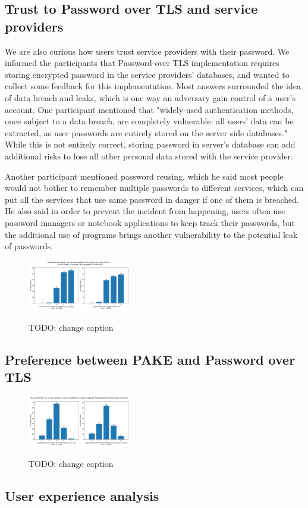 \subsection{Trust to Password over TLS and service providers}
We are also curious how users trust service providers with their password.
We informed the participants that Password over TLS implementation requires storing encrypted password in the service providers' databases, and wanted to collect some feedback for this implementation.
Most answers surrounded the idea of data breach and leaks, which is one way an adversary gain control of a user's account.
One participant mentioned that "widely-used authentication methods, once subject to a data breach, are completely vulnerable: all users' data can be extracted, as user passwords are entirely stored on the server side databases."
While this is not entirely correct, storing password in server's database can add additional risks to lose all other personal data stored with the service provider.

Another participant mentioned password reusing, which he said most people would not bother to remember multiple passwords to different services, which can put all the services that use same password in danger if one of them is breached.
He also said in order to prevent the incident from happening, users often use password managers or notebook applications to keep track their passwords, but the additional use of programs brings another vulnerability to the potential leak of passwords.






\begin{figure}[ht]
  \centering
  \includegraphics[width=0.4\textwidth]{./images/secure_preference.png}
  \label{fig:}
  \caption{TODO: change caption}
\end{figure}

\subsection{Preference between PAKE and Password over TLS}








\begin{figure}[ht]
  \centering
  \includegraphics[width=0.4\textwidth]{./images/ux_compare.png}
  \label{fig:}
  \caption{TODO: change caption}
\end{figure}


\subsection{User experience analysis}